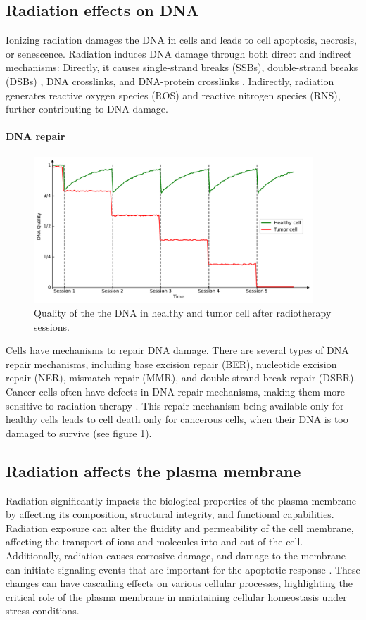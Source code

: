 \subsection{Radiation effects on DNA}
Ionizing radiation damages the DNA \cite{Scholes2014} in cells and leads to cell apoptosis, necrosis, or senescence.
Radiation induces DNA damage through both direct and indirect mechanisms:
Directly, it causes single-strand breaks (SSBs), double-strand breaks (DSBs) \cite{Roots1985}, DNA crosslinks, and DNA-protein crosslinks \cite{Nakano2017}.
Indirectly, radiation generates reactive oxygen species (ROS) and reactive nitrogen species (RNS), further contributing to DNA damage.

\paragraph{DNA repair}
\begin{figure}
	\centering
	\includegraphics[height=5.5cm]{_dna_quality.pdf}
	\caption{Quality of the the DNA in healthy and tumor cell after radiotherapy sessions.}
	\label{fig:dna_quality}
\end{figure}
Cells have mechanisms to repair DNA damage.
There are several types of DNA repair mechanisms, including base excision repair (BER), nucleotide excision repair (NER), mismatch repair (MMR), and double-strand break repair (DSBR).
Cancer cells often have defects in DNA repair mechanisms, making them more sensitive to radiation therapy \cite{Brierley2016}.
This repair mechanism being available only for healthy cells leads to cell death only for cancerous cells, when their DNA is too damaged to survive (see figure  \ref{fig:dna_quality}).

\subsection{Radiation affects the plasma membrane}
Radiation significantly impacts the biological properties of the plasma membrane by affecting its composition, structural integrity, and functional capabilities.
Radiation exposure can alter the fluidity and permeability of the cell membrane, affecting the transport of ions and molecules into and out of the cell.
Additionally, radiation causes corrosive damage, and damage to the membrane can initiate signaling events that are important for the apoptotic response \cite{CohenJonathan1999}.
These changes can have cascading effects on various cellular processes, highlighting the critical role of the plasma membrane in maintaining cellular homeostasis under stress conditions.

